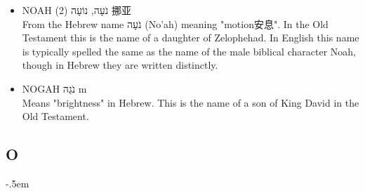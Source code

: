 \begin{itemize}
\item NOAH (2) נֹעָה, נוֹעָה 挪亚 \\
From the Hebrew name נֹעָה (No'ah) meaning "motion安息". In the Old Testament this is the name of a daughter of Zelophehad. In English this name is typically spelled the same as the name of the male biblical character Noah, though in Hebrew they are written distinctly.
\item NOGAH נֹגַה m \\
Means "brightness" in Hebrew. This is the name of a son of King David in the Old Testament.
\end{itemize}

\subsection{O}
\begin{itemize}
\itemsep-.5em 


\end{itemize}
